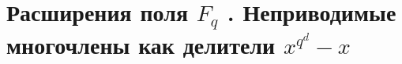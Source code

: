 \section{
 \texorpdfstring{Расширения поля $F_q$ . Неприводимые многочлены как делители $x^{q^d} - x$}.
}
